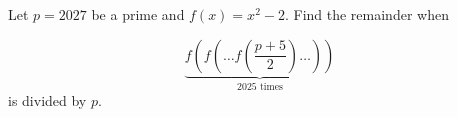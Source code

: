 Let $p=2027$ be a prime and $f(x)=x^2-2$. Find the remainder when

$$\underbrace{f\left(f\left(\dots f\left(\dfrac{p+5}{2}\right)\dots\right)\right)}_{2025\textrm{ times}}$$is divided by $p$.
